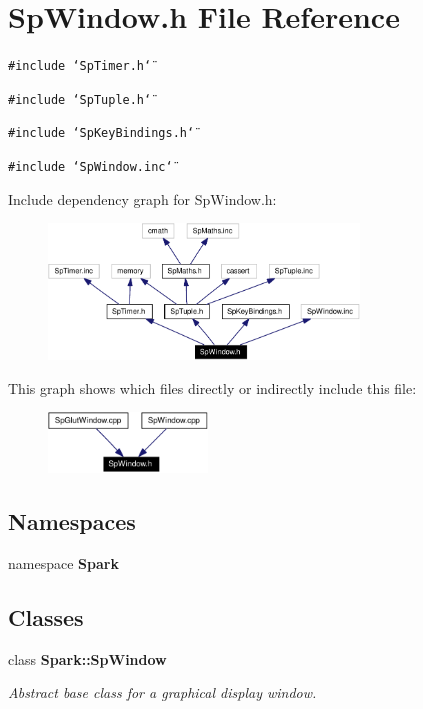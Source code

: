 \section{Sp\-Window.h File Reference}
\label{SpWindow_8h}
{\tt \#include \char`\"{}Sp\-Timer.h\char`\"{}}\par
{\tt \#include \char`\"{}Sp\-Tuple.h\char`\"{}}\par
{\tt \#include \char`\"{}Sp\-Key\-Bindings.h\char`\"{}}\par
{\tt \#include \char`\"{}Sp\-Window.inc\char`\"{}}\par


Include dependency graph for Sp\-Window.h:\begin{figure}[H]
\begin{center}
\leavevmode
\includegraphics[width=234pt]{SpWindow_8h__incl}
\end{center}
\end{figure}


This graph shows which files directly or indirectly include this file:\begin{figure}[H]
\begin{center}
\leavevmode
\includegraphics[width=120pt]{SpWindow_8h__dep__incl}
\end{center}
\end{figure}
\subsection*{Namespaces}
\begin{CompactItemize}
\item 
namespace {\bf Spark}
\end{CompactItemize}
\subsection*{Classes}
\begin{CompactItemize}
\item 
class {\bf Spark::Sp\-Window}
\begin{CompactList}\small\item\em Abstract base class for a graphical display window. \item\end{CompactList}\end{CompactItemize}
